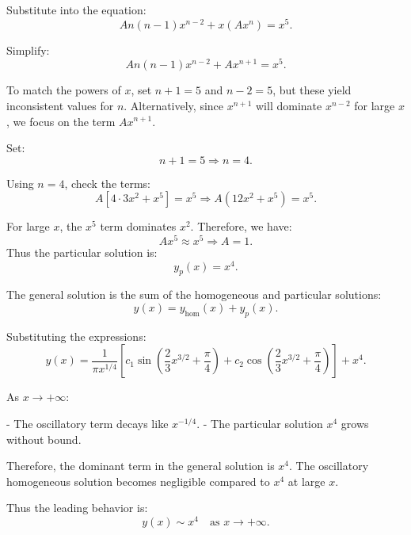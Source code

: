 \documentclass{article}
\begin{document}
{Substitute into the equation:
\[
A n(n-1) x^{n-2} + x (A x^n) = x^5.
\]

Simplify:
\[
A n(n-1) x^{n-2} + A x^{n+1} = x^5.
\]

To match the powers of \( x \), set \( n+1 = 5 \) and \( n-2 = 5 \), but these yield inconsistent values for \( n \). Alternatively, since \( x^{n+1} \) will dominate \( x^{n-2} \) for large \( x \), we focus on the term \( A x^{n+1} \).

Set:
\[
n + 1 = 5 \Rightarrow n = 4.
\]

Using \( n = 4 \), check the terms:
\[
A [4 \cdot 3 x^2 + x^5] = x^5 \Rightarrow A (12 x^2 + x^5) = x^5.
\]

For large \( x \), the \( x^5 \) term dominates \( x^2 \). Therefore, we have:
\[
A x^5 \approx x^5 \Rightarrow A = 1.
\]
Thus the particular solution is:
\[
y_p(x) = x^4.
\]

The general solution is the sum of the homogeneous and particular solutions:
\[
y(x) = y_{\text{hom}}(x) + y_p(x).
\]

Substituting the expressions:
\[
y(x) = \frac{1}{\pi x^{1/4}} \left[ c_1 \sin \left( \frac{2}{3} x^{3/2} + \frac{\pi}{4} \right) + c_2 \cos \left( \frac{2}{3} x^{3/2} + \frac{\pi}{4} \right) \right] + x^4.
\]

As \( x \to +\infty \):

- The oscillatory term decays like \( x^{-1/4} \).
- The particular solution \( x^4 \) grows without bound.

Therefore, the dominant term in the general solution is \( x^4 \). The oscillatory homogeneous solution becomes negligible compared to \( x^4 \) at large \( x \).

Thus the leading behavior is:
\[
y(x) \sim x^4 \quad \text{as } x \to +\infty.
\]


}
\end{document}
